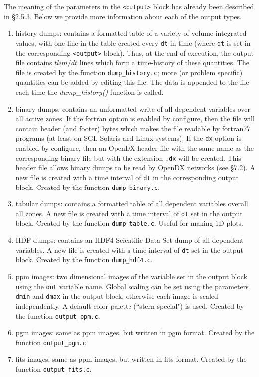 The meaning of the parameters in the {\tt <output>} block has already been described in \S 2.5.3.
Below we provide more information about each of the output types.
\begin{enumerate}
\item history dumps: contains a formatted table of a variety of volume integrated values, with one line in the table created 
every {\tt dt} in time (where {\tt dt} is set in the corresponding {\tt <output>}
block).  Thus, at the end of execution, the output file contains $tlim/dt$
lines which form a time-history of these
quantities.  The file is created by the function {\tt dump\_history.c}; more
(or problem specific) quantities can be added by editing this file.
The data is appended to the file each time the {\it dump\_history()}
function is called.
\item binary dumps: contains an unformatted write of all dependent variables
over all active zones.  If the fortran option is enabled by configure,
then the file will contain header (and footer) bytes which makes the file
readable by fortran77
programs (at least on SGI, Solaris and Linux systems).  If the 
{\tt dx} option is enabled by configure, then an OpenDX header file
with the same name as the corresponding binary file but with the extension
{\tt .dx} will
be created.  This header file allows binary dumps to be read by OpenDX
networks (see \S7.2).  A new file is created with a time interval of {\tt dt}
in the corresponding output block.  Created by the function
{\tt dump\_binary.c}. 
\item tabular dumps: contains a formatted table of all dependent variables 
overall all zones.
A new file is created with a time interval of {\tt dt} set in the output
block.  Created by the function {\tt dump\_table.c}.
Useful for making 1D plots.
\item HDF dumps: contains an HDF4 Scientific Data Set dump of all
dependent variables.  A new file is created with a time interval of {\tt dt}
set in the output block.  Created by the function {\tt dump\_hdf4.c}.
\item ppm images:  two dimensional images of the variable set in the output
block using the {\tt out} variable name.  Global scaling can be set using the
parameters {\tt dmin} and {\tt dmax} in the output block, otherwise each image
is scaled independently.  A default color palette (``stern special") is used. 
Created by the function {\tt output\_ppm.c}.
\item pgm images: same as ppm images, but written in pgm format.
Created by the function {\tt output\_pgm.c}.
\item fits images: same as ppm images, but written in fits format.
Created by the function {\tt output\_fits.c}.
\end{enumerate}

